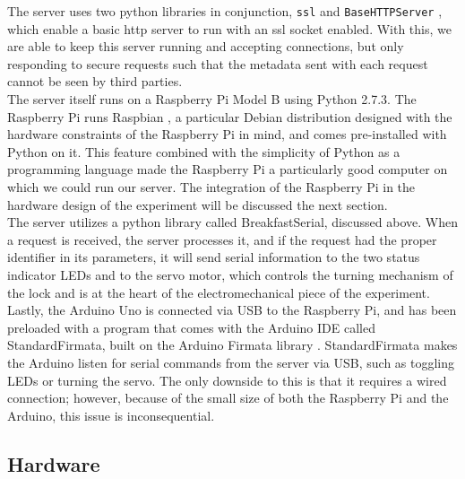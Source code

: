 \documentclass[10pt]{article}
\begin{document}
\begin{multicols}{2}
The server uses two python libraries in conjunction, \texttt{ssl} \cite{pyssl} and \texttt{BaseHTTPServer} \cite{BaseHTTPServer}, which enable a basic http server to run with an ssl socket enabled. With this, we are able to keep this server running and accepting connections, but only responding to secure requests such that the metadata sent with each request cannot be seen by third parties. \\

The server itself runs on a Raspberry Pi Model B using Python 2.7.3. The Raspberry Pi runs Raspbian \cite{raspbian}, a particular Debian distribution designed with the hardware constraints of the Raspberry Pi in mind, and comes pre-installed with Python on it. This feature combined with the simplicity of Python as a programming language made the Raspberry Pi a particularly good computer on which we could run our server. The integration of the Raspberry Pi in the hardware design of the experiment will be discussed the next section. \\

The server utilizes a python library called BreakfastSerial, discussed above. When a request is received, the server processes it, and if the request had the proper identifier in its parameters, it will send serial information to the two status indicator LEDs and to the servo motor, which controls the turning mechanism of the lock and is at the heart of the electromechanical piece of the experiment. \\

Lastly, the Arduino Uno is connected via USB to the Raspberry Pi, and has been preloaded with a program that comes with the Arduino IDE called StandardFirmata, built on the Arduino Firmata library \cite{arduinofirmata}. StandardFirmata makes the Arduino listen for serial commands from the server via USB, such as toggling LEDs or turning the servo. The only downside to this is that it requires a wired connection; however, because of the small size of both the Raspberry Pi and the Arduino, this issue is inconsequential. \\

\subsection{Hardware}


\end{multicols}
\end{document}
